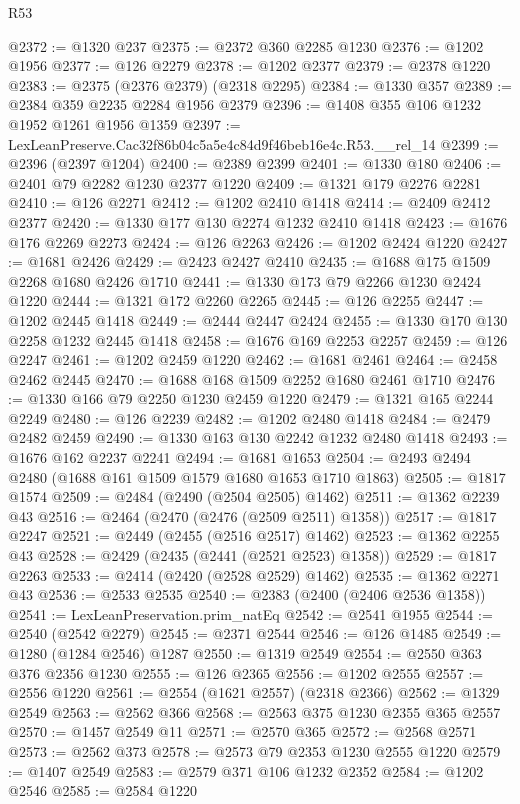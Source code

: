 \begin{lexlean}{R53}
\begin{coremodule}
@2372 := @1320 @237
@2375 := @2372 @360 @2285 @1230
@2376 := @1202 @1956
@2377 := @126 @2279
@2378 := @1202 @2377
@2379 := @2378 @1220
@2383 := @2375 (@2376 @2379) (@2318 @2295)
@2384 := @1330 @357
@2389 := @2384 @359 @2235 @2284 @1956 @2379
@2396 := @1408 @355 @106 @1232 @1952 @1261 @1956 @1359
@2397 := LexLeanPreserve.Cac32f86b04c5a5e4c84d9f46beb16e4c.R53.__rel_14
@2399 := @2396 (@2397 @1204)
@2400 := @2389 @2399
@2401 := @1330 @180
@2406 := @2401 @79 @2282 @1230 @2377 @1220
@2409 := @1321 @179 @2276 @2281
@2410 := @126 @2271
@2412 := @1202 @2410 @1418
@2414 := @2409 @2412 @2377
@2420 := @1330 @177 @130 @2274 @1232 @2410 @1418
@2423 := @1676 @176 @2269 @2273
@2424 := @126 @2263
@2426 := @1202 @2424 @1220
@2427 := @1681 @2426
@2429 := @2423 @2427 @2410
@2435 := @1688 @175 @1509 @2268 @1680 @2426 @1710
@2441 := @1330 @173 @79 @2266 @1230 @2424 @1220
@2444 := @1321 @172 @2260 @2265
@2445 := @126 @2255
@2447 := @1202 @2445 @1418
@2449 := @2444 @2447 @2424
@2455 := @1330 @170 @130 @2258 @1232 @2445 @1418
@2458 := @1676 @169 @2253 @2257
@2459 := @126 @2247
@2461 := @1202 @2459 @1220
@2462 := @1681 @2461
@2464 := @2458 @2462 @2445
@2470 := @1688 @168 @1509 @2252 @1680 @2461 @1710
@2476 := @1330 @166 @79 @2250 @1230 @2459 @1220
@2479 := @1321 @165 @2244 @2249
@2480 := @126 @2239
@2482 := @1202 @2480 @1418
@2484 := @2479 @2482 @2459
@2490 := @1330 @163 @130 @2242 @1232 @2480 @1418
@2493 := @1676 @162 @2237 @2241
@2494 := @1681 @1653
@2504 := @2493 @2494 @2480 (@1688 @161 @1509 @1579 @1680 @1653 @1710 @1863)
@2505 := @1817 @1574
@2509 := @2484 (@2490 (@2504 @2505) @1462)
@2511 := @1362 @2239 @43
@2516 := @2464 (@2470 (@2476 (@2509 @2511) @1358))
@2517 := @1817 @2247
@2521 := @2449 (@2455 (@2516 @2517) @1462)
@2523 := @1362 @2255 @43
@2528 := @2429 (@2435 (@2441 (@2521 @2523) @1358))
@2529 := @1817 @2263
@2533 := @2414 (@2420 (@2528 @2529) @1462)
@2535 := @1362 @2271 @43
@2536 := @2533 @2535
@2540 := @2383 (@2400 (@2406 @2536 @1358))
@2541 := LexLeanPreservation.prim_natEq
@2542 := @2541 @1955
@2544 := @2540 (@2542 @2279)
@2545 := @2371 @2544
@2546 := @126 @1485
@2549 := @1280 (@1284 @2546) @1287
@2550 := @1319 @2549
@2554 := @2550 @363 @376 @2356 @1230
@2555 := @126 @2365
@2556 := @1202 @2555
@2557 := @2556 @1220
@2561 := @2554 (@1621 @2557) (@2318 @2366)
@2562 := @1329 @2549
@2563 := @2562 @366
@2568 := @2563 @375 @1230 @2355 @365 @2557
@2570 := @1457 @2549 @11
@2571 := @2570 @365
@2572 := @2568 @2571
@2573 := @2562 @373
@2578 := @2573 @79 @2353 @1230 @2555 @1220
@2579 := @1407 @2549
@2583 := @2579 @371 @106 @1232 @2352
@2584 := @1202 @2546
@2585 := @2584 @1220

\end{coremodule}
\end{lexlean}
